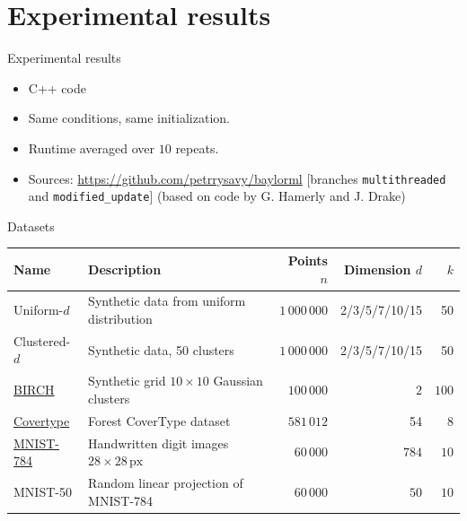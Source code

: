 \documentclass[10pt, compress]{beamer}
\begin{document}
\section{Experimental results}

\begin{frame}{Experimental results}
  \begin{itemize}
    \item C++ code
    \item Same conditions, same initialization.
    \item Runtime averaged over $10$ repeats.
    \item Sources: \url{https://github.com/petrrysavy/baylorml} [branches \texttt{multithreaded} and \texttt{modified\_update}] (based on code by G. Hamerly and J. Drake)
  \end{itemize}
\end{frame}

\begin{frame}{Datasets}
  \small
\centering
\label{tab:datasets}
\begin{tabularx}{\textwidth}{lXrrr}
\hline
Name & Description & Points $n$ & Dimension $d$ & $k$ \\
\hline
Uniform-$d$ & Synthetic data from uniform distribution & $1 \, 000 \, 000$ & 2/3/5/7/10/15 & 50 \\
Clustered-$d$ & Synthetic data, 50 clusters & $1 \, 000 \, 000$ & 2/3/5/7/10/15 & 50 \\
\href{http://cs.joensuu.fi/sipu/datasets/}{BIRCH} & Synthetic grid $10\times 10$ Gaussian clusters & $100 \, 000$ & $2$ & $100$ \\
\href{https://archive.ics.uci.edu/ml/datasets/Covertype}{Covertype} & Forest CoverType dataset & $581 \, 012$ & 54 & 8 \\
\href{http://yann.lecun.com/exdb/mnist/}{MNIST-784} & Handwritten digit images $28\times 28\,\mathrm{px}$ & $60 \, 000$ & $784$ & $10$ \\
MNIST-50 & Random linear projection of MNIST-784 & $60 \, 000$ & $50$ & $10$ \\
\hline
\end{tabularx}
\end{frame}
\end{document}

